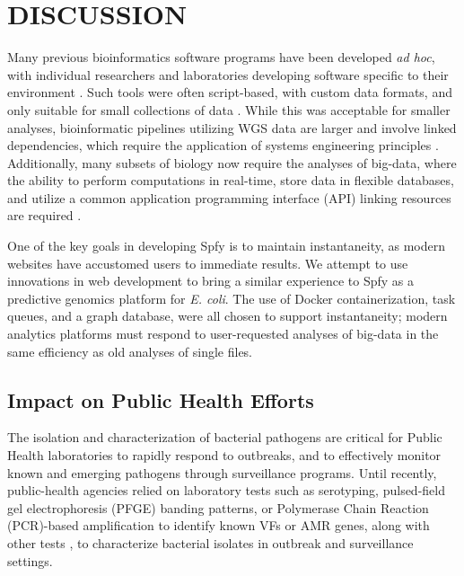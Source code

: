 \documentclass[a4,center,fleqn]{NAR}
\begin{document}


\section{DISCUSSION}

Many previous bioinformatics software programs have been developed \textit{ad hoc}, with individual researchers and laboratories developing software specific to their environment \citep{de2015trends}.
Such tools were often script-based, with custom data formats, and only suitable for small collections of data \citep{de2015trends}.
While this was acceptable for smaller analyses, bioinformatic pipelines utilizing WGS data are larger and involve linked dependencies, which require the application of systems engineering principles \citep{schatz2015biological}.
Additionally, many subsets of biology now require the analyses of big-data, where the ability to perform computations in real-time, store data in flexible databases, and utilize a common application programming interface (API) linking resources are required \citep{swaminathan2016review}.

One of the key goals in developing Spfy is to maintain instantaneity, as modern websites have accustomed users to immediate results.
We attempt to use innovations in web development to bring a similar experience to Spfy as a predictive genomics platform for \textit{E. coli}.
The use of Docker containerization, task queues, and a graph database, were all chosen to support instantaneity; modern analytics platforms must respond to user-requested analyses of big-data in the same efficiency as old analyses of single files.

\subsection{Impact on Public Health Efforts}

The isolation and characterization of bacterial pathogens are critical for Public Health laboratories to rapidly respond to outbreaks, and to effectively monitor known and emerging pathogens through surveillance programs.
Until recently, public-health agencies relied on laboratory tests such as serotyping, pulsed-field gel electrophoresis (PFGE) banding patterns, or Polymerase Chain Reaction (PCR)-based amplification to identify known VFs or AMR genes, along with other tests \citep{ronholm2016navigating}, to characterize bacterial isolates in outbreak and surveillance settings.
\end{document}
